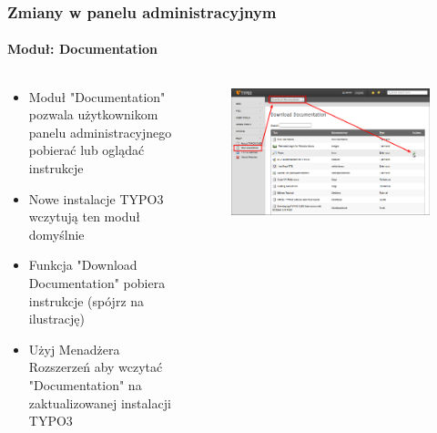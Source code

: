 
\begin{frame}[fragile]
	\frametitle{Zmiany w panelu administracyjnym}
	\framesubtitle{Moduł: Documentation}

	\begin{columns}[T]

		\begin{column}{.5\textwidth}
			\begin{itemize}
				\item Moduł "Documentation" pozwala użytkownikom panelu administracyjnego pobierać lub oglądać instrukcje
				\item Nowe instalacje TYPO3 wczytują ten moduł domyślnie
				\item Funkcja "Download Documentation" pobiera instrukcje (spójrz na ilustrację)
				\item Użyj Menadżera Rozszerzeń aby wczytać "Documentation" na zaktualizowanej instalacji TYPO3
			\end{itemize}
		\end{column}

		\begin{column}{.5\textwidth}
			\begin{figure}\vspace*{-0.4cm}
				\includegraphics[width=1\linewidth]{Images/BackendChanges/DownloadDocumentation.png}
			\end{figure}
		\end{column}

	\end{columns}

\end{frame}

